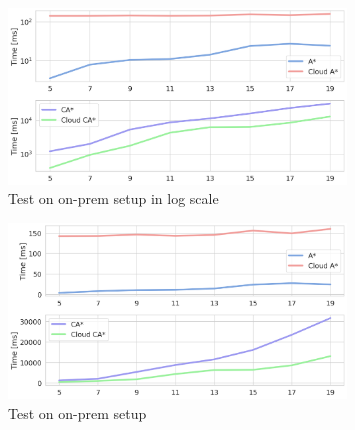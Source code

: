 
\begin{figure}[H]
    \centering
    \includegraphics[width=0.8\textwidth]{pictures/on_prem_test_time_log.png}
    \caption{Test on on-prem setup in log scale}
    \label{fig:on_prem_test_time_log}
\end{figure}

\begin{figure}[H]
    \centering
    \includegraphics[width=0.8\textwidth]{pictures/on_prem_test_time.png}
    \caption{Test on on-prem setup}
    \label{fig:on_prem_test_time}
\end{figure}